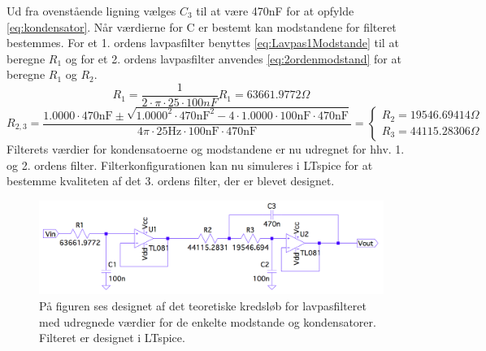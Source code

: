 \noindent Ud fra ovenstående ligning vælges $C_3$ til at være 470nF for at opfylde \eqref{eq:kondensator}. Når værdierne for C er bestemt kan modstandene for filteret bestemmes. For et 1. ordens lavpasfilter benyttes \eqref{eq:Lavpas1Modstande} til at beregne $R_1$ og for et 2. ordens lavpasfilter anvendes \eqref{eq:2ordenmodstand} for at beregne $R_1$ og $R_2$. 
\begin{equation} \label{eq:1ordenmodstand}
R_{1} = \frac{1}{2 \cdot \pi \cdot 25 \cdot 100nF} R_{1} = 63661.9772 \Omega
\end{equation}
\begin{equation}
\label{eq:2ordenmodstand}R_{2,3} = \frac{1.0000 \cdot 470\text{nF} \pm \sqrt{1.0000^2 \cdot 470\text{nF}^2 - 4 \cdot 1.0000 \cdot 100\text{nF} \cdot 470\text{nF}}}{4 \pi \cdot 25\text{Hz} \cdot 100\text{nF} \cdot 470\text{nF}} = \begin{cases} R_{2} = 19546.69414 \Omega \\ R_{3} =  44115.28306 \Omega \end{cases}
\end{equation}
\noindent Filterets værdier for kondensatoerne og modstandene er nu udregnet for hhv. 1. og 2. ordens filter. Filterkonfigurationen kan nu simuleres i LTspice for at bestemme kvaliteten af det 3. ordens filter, der er blevet designet.

\begin{figure}[H]
	\centering
	\includegraphics[scale=0.35]{figures/cProblemloesning/Lavpasfilter1_LTspice.PNG}
	\caption{På figuren ses designet af det teoretiske kredsløb for lavpasfilteret med udregnede værdier for de enkelte modstande og kondensatorer. Filteret er designet i LTspice.}
	\label{fig:lavpasfilter1_LTspice}
\end{figure}

